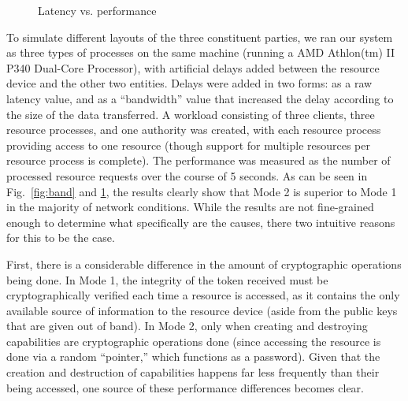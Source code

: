\begin{figure}[t]
\caption{Latency vs. performance}
\label{fig:late}
\end{figure}



To simulate different layouts of the three constituent parties, we ran our system as three types of processes on the same machine (running a AMD Athlon(tm) II P340 Dual-Core Processor), with artificial delays added between the resource device and the other two entities. Delays were added in two forms: as a raw latency value, and as a ``bandwidth'' value that increased the delay according to the size of the data transferred. A workload consisting of three clients, three resource processes, and one authority was created, with each resource process providing access to one resource (though support for multiple resources per resource process is complete). The performance was measured as the number of processed resource requests over the course of 5 seconds. As can be seen in Fig.~\ref{fig:band} and \ref{fig:late}, the results clearly show that Mode 2 is superior to Mode 1 in the majority of network conditions. While the results are not fine-grained enough to determine what specifically are the causes, there two intuitive reasons for this to be the case.

First, there is a considerable difference in the amount of cryptographic operations being done. In Mode 1, the integrity of the token received must be cryptographically verified each time a resource is accessed, as it contains the only available source of information to the resource device (aside from the public keys that are given out of band). In Mode 2, only when creating and destroying capabilities are cryptographic operations done (since accessing the resource is done via a random ``pointer,'' which functions as a password). Given that the creation and destruction of capabilities happens far less frequently than their being accessed, one source of these performance differences becomes clear.

